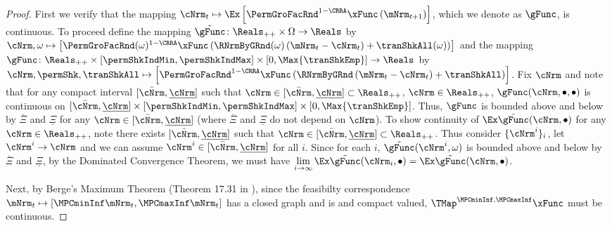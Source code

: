 \documentclass[\econtexRoot/BufferStockTheory]{subfiles}
\begin{document}
\begin{proof}
First we verify that the mapping $\cNrm_{t}\mapsto \Ex\left[ {\PermGroFacRnd}^{1-\CRRA }{\mathfrak{\xFunc}}
                                            \left( {\mNrm}_{t+1}\right) \right]$, which we denote as $\gFunc$,  is continuous.
To proceed define the mapping $\tilde{\gFunc}\colon \Reals_{++}\times\Omega\rightarrow \Reals$ by $\cNrm, \omega \mapsto\left[ {\PermGroFacRnd}(\omega)^{1-\CRRA }{\mathfrak{\xFunc}}
                                            \left( \RNrmByGRnd(\omega)\left(\mNrm_{t} - \cNrm_{t}\right) + \tranShkAll(\omega)\right) \right]$ and the mapping $\gFunc\colon \Reals_{++}\times[\permShkIndMin,\permShkIndMax]\times [0,\Max{\tranShkEmp}] \rightarrow \Reals$ by $\cNrm, \permShk,\tranShkAll \mapsto\left[ {\PermGroFacRnd}^{1-\CRRA }{\mathfrak{\xFunc}}
                                            \left( \RNrmByGRnd\left(\mNrm_{t} - \cNrm_{t}\right) + \tranShkAll\right) \right]$.
Fix $\cNrm$ and note that for any compact interval $[\bar{\cNrm},\underline{\cNrm}]$ such that $\cNrm\in [\bar{\cNrm},\underline{\cNrm}]\subset \Reals_{++}$, $\cNrm\in \Reals_{++}$, $\gFunc(\cNrm,\bullet,\bullet)$ is continuous on $[\bar{\cNrm},\underline{\cNrm}]\times[\permShkIndMin,\permShkIndMax]\times [0,\Max{\tranShkEmp}]$.
Thus, $\gFunc$ is bounded above and below by $\bar{\Xi}$ and $\underline{\Xi}$ for any $\cNrm\in [\bar{\cNrm},\underline{\cNrm}]$ (where $\bar{\Xi}$ and $\underline{\Xi}$ do not depend on $\cNrm$).
To show continuity of $\Ex \tilde{\gFunc}(\cNrm,\bullet)$ for any $\cNrm \in \Reals_{++}$, note there exists  $[\bar{\cNrm},\underline{\cNrm}]$ such that $\cNrm\in [\bar{\cNrm},\underline{\cNrm}]\subset \Reals_{++}$.
Thus consider $\{\cNrm^{i}\}_{i}$, let $\cNrm^{i}\rightarrow \cNrm$ and we can assume $\cNrm^{i}\in [\bar{\cNrm},\underline{\cNrm}]$ for all $i$.
Since for each $i$, $\tilde{\gFunc}(\cNrm^{i},\omega)$ is bounded above and below by $\bar{\Xi}$ and $\underline{\Xi}$, by the Dominated Convergence Theorem, we must have $\lim\limits_{i\rightarrow \infty}\Ex \tilde{\gFunc}(\cNrm_{i},\bullet) = \Ex \tilde{\gFunc}(\cNrm,\bullet)$.

                                            
Next, by Berge's Maximum Theorem (Theorem 17.31 in \cite{Aliprantis2005}), since the feasibilty correspondence $\mNrm_{t}\mapsto [\MPCminInf \mNrm_{t}, \MPCmaxInf \mNrm_{t}]$ has a closed graph and is and compact valued, $\TMap^{\MPCminInf, \MPCmaxInf}{\mathfrak{\xFunc}}$ must be continuous.



\end{proof}
\end{document}
